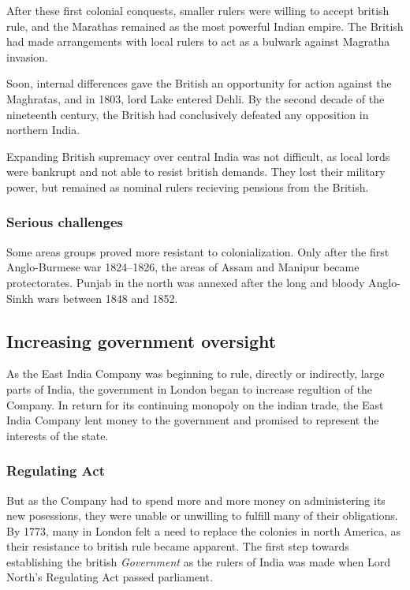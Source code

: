 \documentclass[11pt, a4paper, headings=standardclasses]{scrartcl}
\begin{document}
After these first colonial conquests, smaller rulers were willing to accept british rule\autocite[Chapter 4, sections 8 and 9]{RF}, and the Marathas remained as the most powerful Indian empire. The British had made arrangements with local rulers to act as a bulwark against Magratha invasion.\autocite[273]{RF}

Soon, internal differences gave the British an opportunity for action against the Magh\-ratas, and in 1803, lord Lake entered Dehli. By the second decade of the nineteenth century, the British had conclusively defeated any opposition in northern India.\autocite[274]{RF}

Expanding British supremacy over central India was not difficult, as local lords were bankrupt and not able to resist british demands. They lost their military power, but remained as nominal rulers recieving pensions from the British.\autocite[276]{RF}

\subsubsection{Serious challenges}

Some areas groups proved more resistant to colonialization. Only after the first Anglo-Burmese war 1824--1826, the areas of Assam and Manipur became protectorates. Punjab in the north was annexed after the long and bloody Anglo-Sinkh wars between 1848 and 1852.\autocite[277]{RF}

\subsection{Increasing government oversight}

As the East India Company was beginning to rule, directly or indirectly, large parts of India, the government in London began to increase regultion of the Company. In return for its continuing monopoly on the indian trade, the East India Company lent money to the government and promised to represent the interests of the state.\autocite[394]{RF, parliament}

\subsubsection{Regulating Act}

But as the Company had to spend more and more money on administering its new posessions, they were unable or unwilling to fulfill many of their obligations.\autocite[395]{RF} By 1773, many in London felt a need to replace the colonies in north America, as their resistance to british rule became apparent. The first step towards establishing the british \textit{Government} as the rulers of India was made when Lord North's Regulating Act passed parliament.\autocite[395]{RF, parliament}
\end{document}
